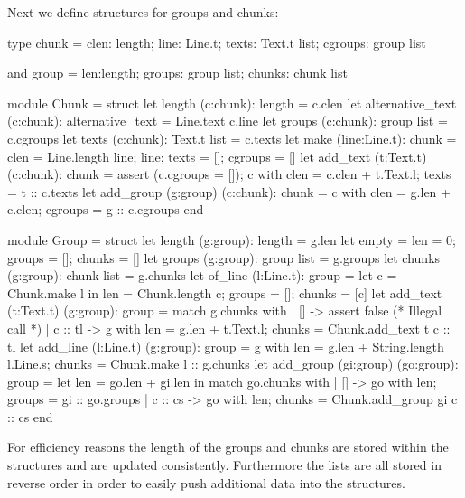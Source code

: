 \documentclass[12pt]{article}
\begin{document}
Next we define structures for groups and chunks:
\begin{ocaml}
  type chunk = {clen: length;
                line: Line.t;
                texts:  Text.t list;
                cgroups: group list}

  and group = {len:length;
               groups: group list;
               chunks: chunk list}

  module Chunk =
    struct
      let length (c:chunk): length = c.clen
      let alternative_text (c:chunk): alternative_text = Line.text c.line
      let groups (c:chunk): group list = c.cgroups
      let texts (c:chunk): Text.t list = c.texts
      let make (line:Line.t): chunk =
        {clen = Line.length line; line; texts = []; cgroups = []}
      let add_text (t:Text.t) (c:chunk): chunk =
        assert (c.cgroups = []);
        {c with clen = c.clen + t.Text.l; texts = t :: c.texts}
      let add_group (g:group) (c:chunk): chunk =
        {c with clen = g.len + c.clen; cgroups = g :: c.cgroups}
    end


  module Group =
    struct
      let length (g:group): length =  g.len
      let empty = {len = 0; groups = []; chunks = []}
      let groups (g:group): group list = g.groups
      let chunks (g:group): chunk list = g.chunks
      let of_line (l:Line.t): group =
        let c = Chunk.make l in
        {len = Chunk.length c; groups = []; chunks = [c]}
      let add_text (t:Text.t) (g:group): group =
        match g.chunks with
        | [] ->
           assert false (* Illegal call *)
        | c :: tl ->
           {g with len = g.len + t.Text.l; chunks = Chunk.add_text t c :: tl}
      let add_line (l:Line.t) (g:group): group =
        {g with
          len = g.len + String.length l.Line.s;
          chunks = Chunk.make l :: g.chunks}
      let add_group (gi:group) (go:group): group =
        let len = go.len + gi.len
        in
        match go.chunks with
        | [] ->
           {go with len; groups = gi :: go.groups}
        | c :: cs ->
           {go with len; chunks = Chunk.add_group gi c :: cs}
    end
\end{ocaml}
%
For efficiency reasons the length of the groups and chunks are stored within
the structures and are updated consistently. Furthermore the lists are all
stored in reverse order in order to easily push additional data into the
structures.
\end{document}

